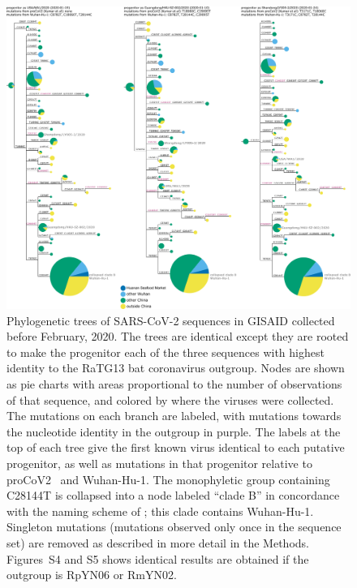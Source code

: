 \documentclass[9pt,twocolumn,twoside]{gsajnl_modified}
\begin{document}
 \begin{figure}
 \centerline{
 \includegraphics[width=\linewidth]{figures/Figure_3.pdf}
 }
 \caption{
 Phylogenetic trees of SARS-CoV-2 sequences in GISAID collected before February, 2020.
 The trees are identical except they are rooted to make the progenitor each of the three sequences with highest identity to the RaTG13 bat coronavirus outgroup.
Nodes are shown as pie charts with areas proportional to the number of observations of that sequence, and colored by where the viruses were collected.
The mutations on each branch are labeled, with mutations towards the nucleotide identity in the outgroup in purple.
The labels at the top of each tree give the first known virus identical to each putative progenitor, as well as mutations in that progenitor relative to proCoV2~\citep{kumar2021evolutionary} and Wuhan-Hu-1.
The monophyletic group containing C28144T is collapsed into a node labeled ``clade B'' in concordance with the naming scheme of \citet{rambaut2020dynamic}; this clade contains Wuhan-Hu-1.
Singleton mutations (mutations observed only once in the sequence set) are removed as described in more detail in the Methods.
 Figures~S4 and S5 shows identical results are obtained if the outgroup is RpYN06 or RmYN02.
\label{fig:tree_RaTG13}
 }
 \end{figure}
\end{document}

